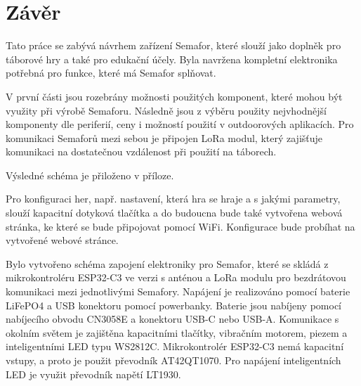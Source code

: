 \chapter*{Závěr}
{}

Tato práce se zabývá návrhem zařízení Semafor, které slouží jako doplněk pro táborové hry a také pro edukační účely. Byla navržena kompletní 
elektronika potřebná pro funkce, které má Semafor splňovat. 

V první části jsou rozebrány možnosti použitých komponent, které mohou být využity při výrobě Semaforu. Následně jsou z výběru použity 
nejvhodnější komponenty dle periferií, ceny i možností použití v outdoorových aplikacích.
Pro komunikaci Semaforů mezi sebou je připojen LoRa modul, který zajišťuje komunikaci na dostatečnou vzdálenost při použití na táborech. 

Výsledné schéma je přiloženo v příloze. 

Pro konfiguraci her, např. nastavení, která hra se hraje a s jakými parametry, slouží kapacitní dotyková tlačítka a do budoucna bude také 
vytvořena webová stránka, ke které se bude připojovat pomocí WiFi. Konfigurace bude probíhat na vytvořené webové stránce. 

Bylo vytvořeno schéma zapojení elektroniky pro Semafor, které se skládá z mikrokontroléru ESP32-C3 ve verzi s anténou a LoRa modulu pro 
bezdrátovou komunikaci mezi jednotlivými Semafory. Napájení je realizováno pomocí baterie LiFePO4 a USB konektoru pomocí powerbanky. Baterie 
jsou nabíjeny pomocí nabíjecího obvodu CN3058E a konektoru USB-C nebo USB-A. Komunikace s okolním světem je zajištěna kapacitními tlačítky, 
vibračním motorem, piezem a inteligentními LED typu WS2812C. Mikrokontrolér ESP32-C3 nemá kapacitní vstupy, a proto je použit převodník AT42QT1070.
Pro napájení inteligentních LED je využit převodník napětí LT1930. 

